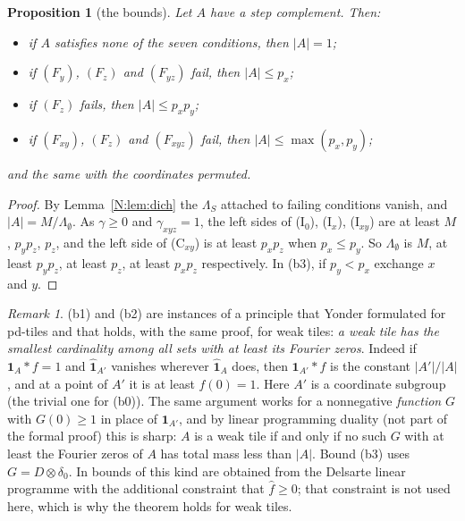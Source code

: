 \documentclass[11pt,a4paper]{amsart}
\newtheorem{proposition}[theorem]{Proposition}
\theoremstyle{definition}
\theoremstyle{remark}
\newtheorem{remark}[theorem]{Remark}
\newcommand{\one}{\mathbf{1}}
\begin{document}
\begin{proposition}[the bounds]\label{N:prop:bounds}
Let $A$ have a step complement. Then:
\begin{itemize}
\item[\textup{(b0)}] if $A$ satisfies none of the seven conditions, then $|A|=1$;
\item[\textup{(b1)}] if $(F_y)$, $(F_z)$ and $(F_{yz})$ fail, then $|A|\le p_x$;
\item[\textup{(b2)}] if $(F_z)$ fails, then $|A|\le p_xp_y$;
\item[\textup{(b3)}] if $(F_{xy})$, $(F_z)$ and $(F_{xyz})$ fail, then $|A|\le\max(p_x,p_y)$;
\end{itemize}
and the same with the coordinates permuted.
\end{proposition}
\begin{proof}
By Lemma~\ref{N:lem:dich} the $\Lambda_S$ attached to failing conditions vanish, and $|A|=M/\Lambda_\emptyset$.
As $\gamma\ge0$ and $\gamma_{xyz}=1$, the left sides of (I$_0$), (I$_x$), (I$_{xy}$) are at least $M$, $p_yp_z$,
$p_z$, and the left side of (C$_{xy}$) is at least $p_xp_z$ when $p_x\le p_y$. So $\Lambda_\emptyset$ is
$M$, at least $p_yp_z$, at least $p_z$, at least $p_xp_z$ respectively. In (b3), if $p_y<p_x$ exchange $x$ and $y$.
\end{proof}

\begin{remark}\label{N:rem:dual}
(b1) and (b2) are instances of a principle that Yonder formulated for pd-tiles and that holds, with the same
proof, for weak tiles: \emph{a weak tile has the smallest cardinality among all sets with at least its Fourier
zeros}. Indeed if $\one_A*f=1$ and $\hat{\one}_{A'}$ vanishes wherever
$\hat{\one}_A$ does, then $\one_{A'}*f$ is the constant $|A'|/|A|$, and at a point of $A'$ it is at least
$f(0)=1$. Here $A'$ is a coordinate subgroup (the trivial one for (b0)). The same argument works for a nonnegative \emph{function} $G$ with
$G(0)\ge1$ in place of $\one_{A'}$, and by linear programming duality (not part of the formal proof) this is
sharp: $A$ is a weak tile if and
only if no such $G$ with at least the Fourier zeros of $A$ has total mass less than $|A|$. Bound (b3) uses
$G=D\otimes\delta_0$. In \cite{KLMS,KF} bounds of this kind are obtained from the Delsarte linear programme with
the additional constraint that $\hat f\ge 0$; that constraint is not used here, which is why the theorem holds
for weak tiles.
\end{remark}
\end{document}
